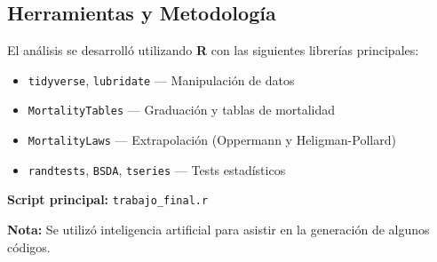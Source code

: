 \subsection{Herramientas y Metodología}

El análisis se desarrolló utilizando \textbf{R} con las siguientes librerías principales:
\begin{itemize}
    \item \texttt{tidyverse}, \texttt{lubridate} — Manipulación de datos
    \item \texttt{MortalityTables} — Graduación y tablas de mortalidad
    \item \texttt{MortalityLaws} — Extrapolación (Oppermann y Heligman-Pollard)
    \item \texttt{randtests}, \texttt{BSDA}, \texttt{tseries} — Tests estadísticos
\end{itemize}

\textbf{Script principal:} \texttt{trabajo\_final.r}

\textbf{Nota:} Se utilizó inteligencia artificial para asistir en la generación de algunos códigos.
